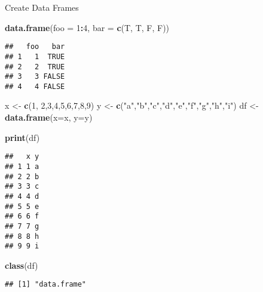 \documentclass[
  ignorenonframetext,
]{beamer}
\newenvironment{Shaded}{\begin{snugshade}}{\end{snugshade}}
\newcommand{\DataTypeTok}[1]{\textcolor[rgb]{0.13,0.29,0.53}{#1}}
\newcommand{\DecValTok}[1]{\textcolor[rgb]{0.00,0.00,0.81}{#1}}
\newcommand{\KeywordTok}[1]{\textcolor[rgb]{0.13,0.29,0.53}{\textbf{#1}}}
\newcommand{\NormalTok}[1]{#1}
\newcommand{\OperatorTok}[1]{\textcolor[rgb]{0.81,0.36,0.00}{\textbf{#1}}}
\newcommand{\StringTok}[1]{\textcolor[rgb]{0.31,0.60,0.02}{#1}}
\begin{document}
\begin{frame}[fragile]{Create Data Frames}
\protect\hypertarget{create-data-frames}{}

\begin{Shaded}
\begin{Highlighting}[]
\KeywordTok{data.frame}\NormalTok{(}\DataTypeTok{foo =} \DecValTok{1}\OperatorTok{:}\DecValTok{4}\NormalTok{, }\DataTypeTok{bar =} \KeywordTok{c}\NormalTok{(T, T, F, F))}
\end{Highlighting}
\end{Shaded}

\begin{verbatim}
##   foo   bar
## 1   1  TRUE
## 2   2  TRUE
## 3   3 FALSE
## 4   4 FALSE
\end{verbatim}

\begin{Shaded}
\begin{Highlighting}[]
\NormalTok{x <-}\StringTok{ }\KeywordTok{c}\NormalTok{(}\DecValTok{1}\NormalTok{, }\DecValTok{2}\NormalTok{,}\DecValTok{3}\NormalTok{,}\DecValTok{4}\NormalTok{,}\DecValTok{5}\NormalTok{,}\DecValTok{6}\NormalTok{,}\DecValTok{7}\NormalTok{,}\DecValTok{8}\NormalTok{,}\DecValTok{9}\NormalTok{)}
\NormalTok{y <-}\StringTok{ }\KeywordTok{c}\NormalTok{(}\StringTok{"a"}\NormalTok{,}\StringTok{"b"}\NormalTok{,}\StringTok{"c"}\NormalTok{,}\StringTok{"d"}\NormalTok{,}\StringTok{"e"}\NormalTok{,}\StringTok{"f"}\NormalTok{,}\StringTok{"g"}\NormalTok{,}\StringTok{"h"}\NormalTok{,}\StringTok{"i"}\NormalTok{)}
\NormalTok{df <-}\StringTok{ }\KeywordTok{data.frame}\NormalTok{(}\DataTypeTok{x=}\NormalTok{x, }\DataTypeTok{y=}\NormalTok{y)}
\end{Highlighting}
\end{Shaded}

\end{frame}

\begin{frame}[fragile]

\begin{Shaded}
\begin{Highlighting}[]
\KeywordTok{print}\NormalTok{(df)}
\end{Highlighting}
\end{Shaded}

\begin{verbatim}
##   x y
## 1 1 a
## 2 2 b
## 3 3 c
## 4 4 d
## 5 5 e
## 6 6 f
## 7 7 g
## 8 8 h
## 9 9 i
\end{verbatim}

\begin{Shaded}
\begin{Highlighting}[]
\KeywordTok{class}\NormalTok{(df)}
\end{Highlighting}
\end{Shaded}

\begin{verbatim}
## [1] "data.frame"
\end{verbatim}

\end{frame}
\end{document}
